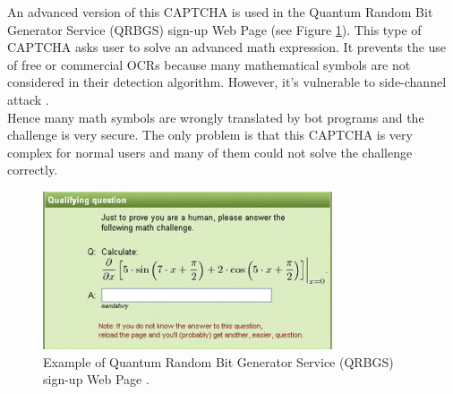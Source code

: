 An advanced version of this CAPTCHA is used in the Quantum Random Bit Generator Service (QRBGS) sign-up Web Page\cite{math_CAPTCHA} (see Figure \ref{soa:QRBGS}). This type of CAPTCHA asks user to solve an advanced math expression. It prevents the use of free or commercial OCRs because many mathematical symbols are not considered in their detection algorithm. However, it's vulnerable to side-channel attack \cite{math_CAPTCHA}.\\
Hence many math symbols are wrongly translated by bot programs and the challenge is very secure. The only problem is that this CAPTCHA is very complex for normal users and many of them could not solve the challenge correctly.
\begin{figure}[h]
     \centering
     \includegraphics[width=.6\linewidth]{Images/StateOfArt/QRBGS}
     \caption{\footnotesize{Example of Quantum Random Bit Generator Service (QRBGS) sign-up Web Page \cite{math_CAPTCHA}.}}\label{soa:QRBGS}
\end{figure}

